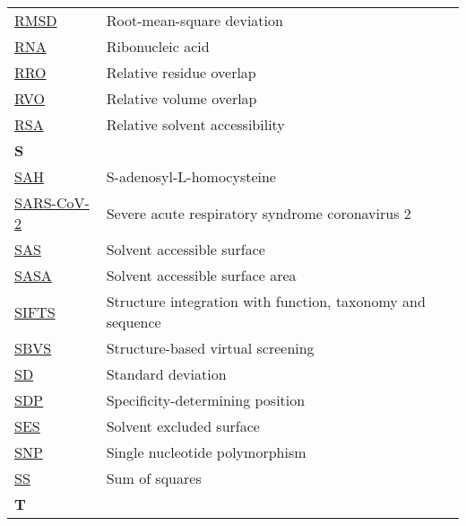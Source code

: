 \begin{longtable}[l]{@{}p{2.5cm}p{12cm}@{}}
\textmd{\href{https://en.wikipedia.org/wiki/Root_mean_square_deviation}{RMSD}} & Root-mean-square deviation \\
\textmd{\href{https://en.wikipedia.org/wiki/RNA}{RNA}} & Ribonucleic acid \\
\textmd{\href{https://jcheminf.biomedcentral.com/articles/10.1186/s13321-024-00923-z}{RRO}} & Relative residue overlap \\
\textmd{\href{https://jcheminf.biomedcentral.com/articles/10.1186/s13321-024-00923-z}{RVO}} & Relative volume overlap \\
\textmd{\href{https://en.wikipedia.org/wiki/Relative_accessible_surface_area}{RSA}} & Relative solvent accessibility \\[0.3175cm]
\textbf{\large S} & \\[0.25cm]
\textmd{\href{https://www.ebi.ac.uk/pdbe-srv/pdbechem/chemicalCompound/show/SAH}{SAH}} & S-adenosyl-L-homocysteine \\
\textmd{\href{https://en.wikipedia.org/wiki/SARS-CoV-2}{SARS-CoV-2}} & Severe acute respiratory syndrome coronavirus 2 \\
\textmd{\href{https://en.wikipedia.org/wiki/Accessible_surface_area}{SAS}} & Solvent accessible surface \\
\textmd{\href{https://en.wikipedia.org/wiki/Accessible_surface_area}{SASA}} & Solvent accessible surface area \\
\textmd{\href{https://www.ebi.ac.uk/pdbe/docs/sifts/}{SIFTS}} & Structure integration with function, taxonomy and sequence \\
\textmd{\href{https://en.wikipedia.org/wiki/Virtual_screening\#Structure-based_methods_known_protein_ligand_docking}{SBVS}} & Structure-based virtual screening \\
\textmd{\href{https://en.wikipedia.org/wiki/Standard_deviation}{SD}} & Standard deviation \\
\textmd{\href{https://www.nature.com/articles/s42003-024-06117-5}{SDP}} & Specificity-determining position \\
\textmd{\href{https://en.wikipedia.org/wiki/Accessible_surface_area\#Relation_to_solvent-excluded_surface}{SES}} & Solvent excluded surface \\
\textmd{\href{https://en.wikipedia.org/wiki/Single-nucleotide_polymorphism}{SNP}} & Single nucleotide polymorphism \\
\textmd{\href{https://en.wikipedia.org/wiki/Sum_of_squares}{SS}} & Sum of squares \\[0.3175cm]
\textbf{\large T} & \\[0.25cm]

\end{longtable}
